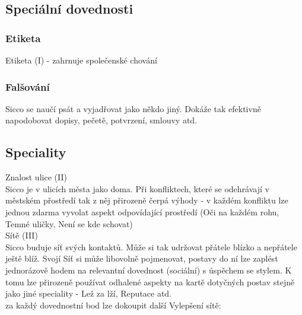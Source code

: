\documentclass[../../main.tex]{subfiles}
\begin{document}
\subsection{Speciální dovednosti}
\label{sec:sicco-dovednosti}

\subsubsection{Etiketa}
\label{sec:sicco-etiketa}
Etiketa (I) - zahrnuje společenské chování\\

\subsubsection{Falšování}
\label{sec:sicco-falsovani}
Sicco se naučí psát a vyjadřovat jako někdo jiný. Dokáže tak efektivně napodobovat dopisy, pečetě, potvrzení, smlouvy atd. \\

\begin{akce}
\end{akce}


\subsection{Speciality}
\label{sec:sicco-speciality}

Znalost ulice (II)\\
Sicco je v ulicích města jako doma. Při konfliktech, které se odehrávají v městském přostředí tak z něj přirozeně čerpá výhody - v každém konfliktu lze jednou zdarma vyvolat aspekt odpovídající prostředí (Oči na každém rohu, Temné uličky, Není se kde schovat)\\

Sítě (III)\\
Sicco buduje síť svých kontaktů. Může si tak udržovat přátele blízko a nepřátele ještě blíž. Svojí Síť si může libovolně pojmenovat, postavy do ní lze zaplést jednorázově hodem na relevantní dovednost (sociální) s úspěchem se stylem. K tomu lze přirozeně používat odhalené aspekty na kartě dotyčných postav stejně jako jiné speciality - Lež za lží, Reputace atd.\\
za každý dovednostní bod lze dokoupit další Vylepšení sítě:
\end{document}
